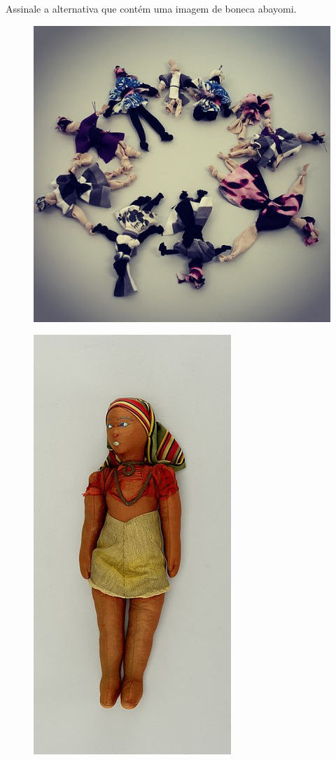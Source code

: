 Assinale a alternativa que contém uma imagem de boneca abayomi.

\begin{figure}[htpb!]
\includegraphics[width=.5\textwidth]{./imgs/art30a.png}
\end{figure}
\begin{figure}[htpb!]
\includegraphics[width=.5\textwidth]{./imgs/art30b.jpg}
\end{figure}

